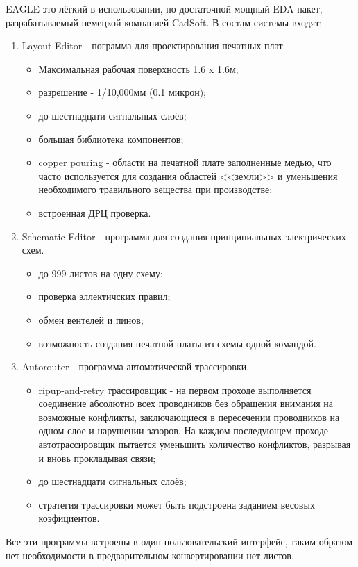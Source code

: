 \begin{par}
EAGLE это лёгкий в использовании, но достаточной мощный EDA пакет, разрабатываемый немецкой компанией CadSoft.
В состам системы входят:
\begin{enumerate}
	\item{}Layout Editor - пограмма для проектирования печатных плат. 
		\begin{itemize}
			\item{}Максимальная рабочая поверхность 1.6 x 1.6м;
			\item{}разрешение - 1/10,000мм (0.1 микрон);
			\item{}до шестнадцати сигнальных слоёв;
			\item{}большая библиотека компонентов;
			\item{}copper pouring - области на печатной плате заполненные  медью, что часто используется для создания областей <<земли>> и уменьшения необходимого травильного вещества при производстве;
			\item{}встроенная ДРЦ проверка.
		\end{itemize}
	
	\item{}Schematic Editor - программа для создания принципиальных электрических схем.
		\begin{itemize}
			\item{}до 999 листов на одну схему;
			\item{}проверка эллектичских правил;
			\item{}обмен вентелей и пинов;
			\item{}возможность создания печатной платы из схемы одной командой.
		\end{itemize}
	\item{}Autorouter - программа автоматической трассировки.
		\begin{itemize}
			\item{}ripup-and-retry трассировщик - на первом проходе выполняется соединение абсолютно всех проводников без обращения внимания на возможные конфликты, заключающиеся в пересечении проводников на одном слое и нарушении зазоров. На каждом последующем проходе автотрассировщик пытается уменьшить количество конфликтов, разрывая и вновь прокладывая связи;
			\item{}до шестнадцати сигнальных слоёв;
			\item{}стратегия трассировки может быть подстроена заданием весовых коэфициентов.
		\end{itemize}
\end{enumerate}
Все эти программы встроены в один пользовательский интерфейс, таким образом нет необходимости в предварительном конвертировании нет-листов.
\end{par}
